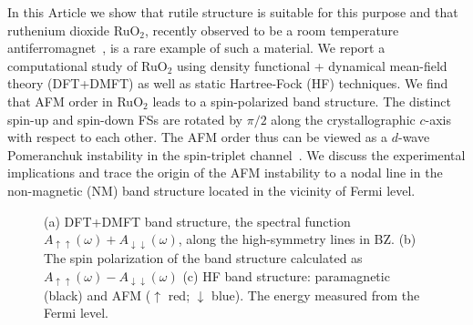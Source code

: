 \documentclass[reprint,twocolumn,superscriptaddress,secnumarabic,amssymb, nobibnotes, aps, prb]{revtex4-1}
\begin{document}
In this Article we show that rutile structure is suitable for this purpose and that
ruthenium dioxide RuO$_2$, recently observed to be a room temperature antiferromagnet~\cite{Berlijn2017,Zhu2019}, is a rare example of such a material. 
We report a computational study of RuO$_2$ using density functional + dynamical mean-field theory (DFT+DMFT) as well as static Hartree-Fock (HF) techniques. We find that 
AFM order in RuO$_2$ leads to a spin-polarized band structure. The distinct spin-up and spin-down 
FSs are rotated by $\pi/2$ along the crystallographic $c$-axis with respect to each other. The AFM order thus can be viewed as a $d$-wave Pomeranchuk instability in the spin-triplet channel~\cite{Wu07}. We discuss the experimental implications and trace the origin of 
the AFM instability to a nodal line in the non-magnetic (NM) band structure located 
in the vicinity of Fermi level. 
\begin{figure}[t]
\caption{(a) DFT+DMFT band structure, the spectral function $A_{\uparrow\uparrow}(\omega)+A_{\downarrow\downarrow}(\omega)$, along the high-symmetry lines
 in BZ. (b)
 The spin polarization of the band structure calculated as $A_{\uparrow\uparrow}(\omega)-A_{\downarrow\downarrow}(\omega)$
(c) HF band structure: paramagnetic (black) and AFM ($\uparrow$ red; $\downarrow$ blue).
The energy measured from the Fermi level.
}
\label{fig:bands}
\end{figure}
\end{document}
